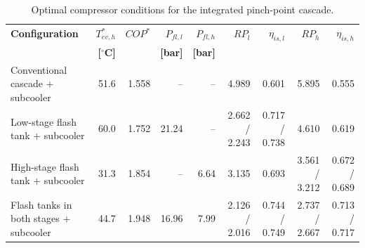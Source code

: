 \begin{table}[htbp]
\centering
\caption{Optimal compressor conditions for the integrated pinch-point cascade.}
\label{tab:integrated_pinch_compressor_optimum}
\scriptsize
\setlength{\tabcolsep}{3pt}
\begin{tabular}{lrrrrrrrr}
\hline
\textbf{Configuration} & \textbf{$T_{ev,h}^{*}$} & \textbf{$COP^{*}$} & \textbf{$P_{fl,l}$} & \textbf{$P_{fl,h}$} & \textbf{$RP_l$} & \textbf{$\eta_{is,l}$} & \textbf{$RP_h$} & \textbf{$\eta_{is,h}$} \\
 & \textbf{[$^{\circ}$C]} & & \textbf{[bar]} & \textbf{[bar]} & & & & \\
\hline
Conventional cascade + subcooler & 51.6 & 1.558 & -- & -- & 4.989 & 0.601 & 5.895 & 0.555 \\
Low-stage flash tank + subcooler & 60.0 & 1.752 & 21.24 & -- & 2.662 / 2.243 & 0.717 / 0.738 & 4.610 & 0.619 \\
High-stage flash tank + subcooler & 31.3 & 1.854 & -- & 6.64 & 3.135 & 0.693 & 3.561 / 3.212 & 0.672 / 0.689 \\
Flash tanks in both stages + subcooler & 44.7 & 1.948 & 16.96 & 7.99 & 2.126 / 2.016 & 0.744 / 0.749 & 2.737 / 2.667 & 0.713 / 0.717 \\
\hline
\end{tabular}
\end{table}
